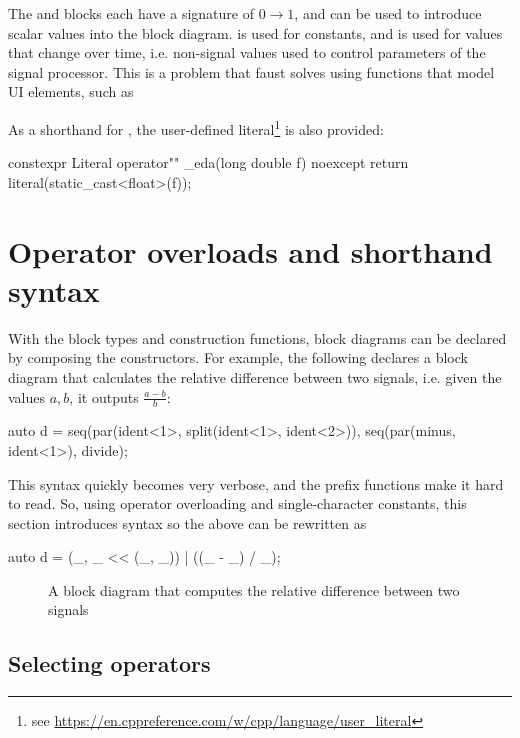 The  and  blocks each have a signature of $0 \rightarrow 1$, and can be used to
introduce scalar values into the block diagram.  is used for constants, and  is used for values that change
over time, i.e. non-signal values used to control parameters of the signal processor. This is a problem that
faust solves using functions that model UI elements, such as \autocite{orlarey2004}

As a shorthand for , the user-defined literal\footnote{see \url{https://en.cppreference.com/w/cpp/language/user_literal}}  is also
provided:
\begin{cppcodenl}
  constexpr Literal operator"" _eda(long double f) noexcept
  {
    return literal(static_cast<float>(f));
  }
\end{cppcodenl}

\section{Operator overloads and shorthand syntax}

With the block types and construction functions, block diagrams can be declared by composing the
constructors. For example, the following declares a block diagram that calculates the relative difference
between two signals, i.e. given the values $a, b$, it outputs $\frac{a - b}{b}$:

\begin{cppcodenl}
  auto d = seq(par(ident<1>, split(ident<1>, ident<2>)), seq(par(minus, ident<1>), divide);
\end{cppcodenl}

This syntax quickly becomes very verbose, and the prefix functions make it hard to read. So, using operator
overloading and single-character constants, this section introduces syntax so the above can be rewritten as

\begin{cppcodenl}
  auto d = (_, _ << (_, _)) | ((_ - _) / _);
\end{cppcodenl}

\begin{figure}
  \centering
  
  \caption{A block diagram that computes the relative difference between two signals}
  \label{fig:block_reldiff}
\end{figure}

\subsection{Selecting operators}

